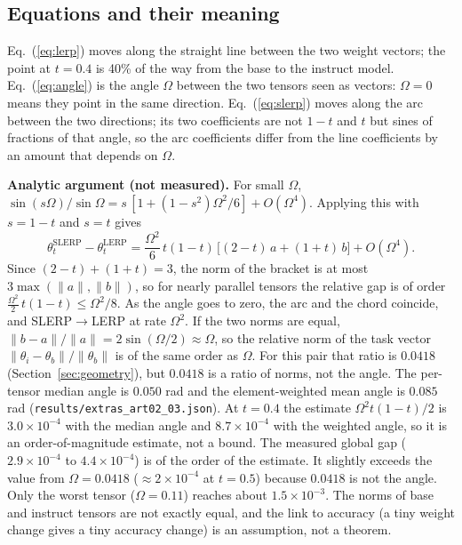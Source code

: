 \documentclass[conference]{IEEEtran}
\begin{document}
\subsection*{Equations and their meaning}
Eq.~(\ref{eq:lerp}) moves along the straight line between the two weight vectors; the point at $t=0.4$ is 40\% of the way from the base to the instruct model. Eq.~(\ref{eq:angle}) is the angle $\Omega$ between the two tensors seen as vectors: $\Omega=0$ means they point in the same direction. Eq.~(\ref{eq:slerp}) moves along the arc between the two directions; its two coefficients are not $1-t$ and $t$ but sines of fractions of that angle, so the arc coefficients differ from the line coefficients by an amount that depends on $\Omega$.

\textbf{Analytic argument (not measured).} For small $\Omega$, $\sin(s\Omega)/\sin\Omega = s\,[1+(1-s^2)\Omega^2/6]+O(\Omega^4)$. Applying this with $s=1-t$ and $s=t$ gives
\begin{equation}
\theta^{\mathrm{SLERP}}_t-\theta^{\mathrm{LERP}}_t=\frac{\Omega^2}{6}\,t(1-t)\,\big[(2-t)\,a+(1+t)\,b\big]+O(\Omega^4). \label{eq:gap}
\end{equation}
Since $(2-t)+(1+t)=3$, the norm of the bracket is at most $3\max(\lVert a\rVert,\lVert b\rVert)$, so for nearly parallel tensors the relative gap is of order $\tfrac{\Omega^2}{2}\,t(1-t)\le\Omega^2/8$. As the angle goes to zero, the arc and the chord coincide, and SLERP$\to$LERP at rate $\Omega^2$. If the two norms are equal, $\lVert b-a\rVert/\lVert a\rVert=2\sin(\Omega/2)\approx\Omega$, so the relative norm of the task vector $\lVert\theta_i-\theta_b\rVert/\lVert\theta_b\rVert$ is of the same order as $\Omega$. For this pair that ratio is $0.0418$ (Section~\ref{sec:geometry}), but $0.0418$ is a ratio of norms, not the angle. The per-tensor median angle is $0.050$ rad and the element-weighted mean angle is $0.085$ rad (\texttt{results/extras\_art02\_03.json}). At $t=0.4$ the estimate $\Omega^2 t(1-t)/2$ is $3.0\times10^{-4}$ with the median angle and $8.7\times10^{-4}$ with the weighted angle, so it is an order-of-magnitude estimate, not a bound. The measured global gap ($2.9\times10^{-4}$ to $4.4\times10^{-4}$) is of the order of the estimate. It slightly exceeds the value from $\Omega=0.0418$ ($\approx2\times10^{-4}$ at $t=0.5$) because $0.0418$ is not the angle. Only the worst tensor ($\Omega=0.11$) reaches about $1.5\times10^{-3}$. The norms of base and instruct tensors are not exactly equal, and the link to accuracy (a tiny weight change gives a tiny accuracy change) is an assumption, not a theorem.
\end{document}
